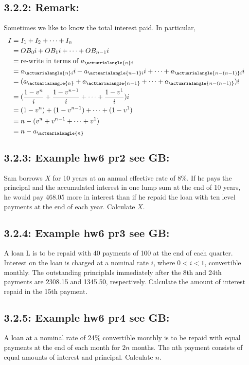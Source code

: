 \documentclass[12pt]{article}
\begin{document}
\subsection{3.2.2: Remark:}
Sometimes we like to know the total interest paid. In particular, 
$$\begin{aligned}
	I &= I_1 + I_2 + \cdots + I_n\\
	  &= OB_0i + OB_1i + \cdots + OB_{n-1}i\\
	  &= \text{re-write in terms of $a_{\actuarialangle{n}i}$}\\
	  &= a_{\actuarialangle{n}i}i + a_{\actuarialangle{n-1}i}i + \cdots + a_{\actuarialangle{n-(n-1)}i}i\\
	  &= (a_{\actuarialangle{n}} + a_{\actuarialangle{n-1}} + \cdots + a_{\actuarialangle{n-(n-1)}})i\\
	  &= (\frac{1-v^{n}}{i} + \frac{1-v^{n-1}}{i} + \cdots + \frac{1-v^{1}}{i})i\\ 
	  &= (1-v^n) + (1-v^{n-1}) + \cdots + (1-v^{1})\\
	  &= n - (v^n + v^{n-1} + \cdots + v^{1})\\
	  &= n - a_{\actuarialangle{n}}
\end{aligned}$$
\subsection{3.2.3: Example hw6 pr2 see GB:}
Sam borrows $X$ for 10 years at an annual effective rate of 8\%. 
If he pays the principal and the accumulated interest in one lump
sum at the end of 10 years, he would pay 468.05 more in interest
than if he repaid the loan with ten level payments at the end of each year. 
Calculate $X$.

\subsection{3.2.4: Example hw6 pr3 see GB:}
A loan L is to be repaid with 40 payments of 100 at the end of each quarter. Interest
on the loan is charged at a nominal rate $i$, where $0<i<1$, convertible monthly.
The outstanding principlals immediately after the 8th and 24th payments
are 2308.15 and 1345.50, respectively. Calculate the amount of interest
repaid in the 15th payment.

\subsection{3.2.5: Example hw6 pr4 see GB:}
A loan at a nominal rate of 24\% convertible monthly is to be repaid with equal payments at the
end of each month for $2n$ months. The nth payment consists of equal amounts of interest and
principal. Calculate $n$.



 
 
\end{document}
